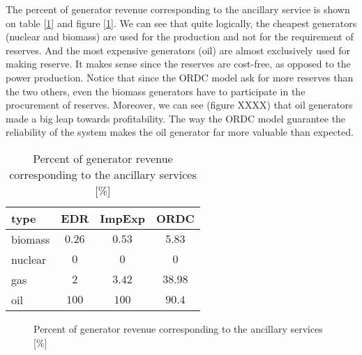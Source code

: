 
The percent of generator revenue corresponding to the ancillary service is shown on table [\ref{pourcentage}] and figure [\ref{pourcent}]. We can see that quite logically, the cheapest generators (nuclear and biomass) are used for the production and not for the requirement of reserves. And the most expensive generators (oil) are almost exclusively used for making reserve. It makes sense since the reserves are cost-free, as opposed to the power production. Notice that since the ORDC model ask for more reserves than the two others, even the biomass generators have to participate in the procurement of reserves. Moreover, we can see (figure XXXX) that oil generators made a big leap towards profitability. The way the ORDC model guarantee the reliability of the system makes the oil generator far more valuable than expected.
 
\begin{table}[H]
\centering
\begin{tabular}{l | c  c  c}
type & EDR & ImpExp & ORDC \\
\hline
biomass &  $0.26$ & $0.53$ & $5.83$ \\
nuclear & $0$ & $0$ & $0$ \\
gas & $2$ & $3.42$ & $38.98$ \\
oil & $100$ & $100$ & $90.4$ \\
\end{tabular}
\caption{Percent of generator revenue corresponding to the ancillary services [\%]}
\label{pourcentage}
\end{table} 
 
\begin{figure}[H]
    \centering
    \setlength\fheight{4cm}
    \setlength{}
    
    \caption{Percent of generator revenue corresponding to the ancillary services [\%]}
    \label{pourcent}
\end{figure}
